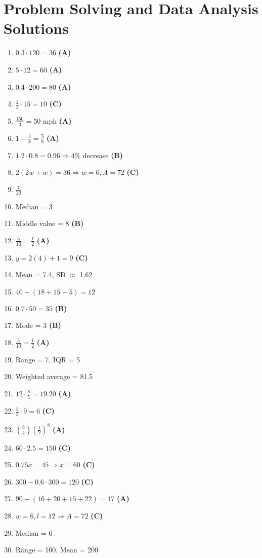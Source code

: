 \documentclass[12pt]{article}
\begin{document}
\section{Problem Solving and Data Analysis Solutions}
\begin{enumerate}[label=\textbf{Question \arabic*:}]
  \item \( 0.3 \cdot 120 = 36 \) \textbf{(A)}
  \item \( 5 \cdot 12 = 60 \) \textbf{(A)}
  \item \( 0.4 \cdot 200 = 80 \) \textbf{(A)}
  \item \( \frac{2}{3} \cdot 15 = 10 \) \textbf{(C)}
  \item \( \frac{150}{3} = 50 \) mph \textbf{(A)}
  \item \( 1 - \frac{3}{8} = \frac{5}{8} \) \textbf{(A)}
  \item \( 1.2 \cdot 0.8 = 0.96 \Rightarrow 4\% \) decrease \textbf{(B)}
  \item \( 2(2w + w) = 36 \Rightarrow w = 6, A = 72 \) \textbf{(C)}
  \item \( \frac{7}{20} \)
  \item Median = 3
  \item Middle value = 8 \textbf{(B)}
  \item \( \frac{5}{10} = \frac{1}{2} \) \textbf{(A)}
  \item \( y = 2(4) + 1 = 9 \) \textbf{(C)}
  \item Mean = 7.4, SD \(\approx\) 1.62
  \item \( 40 - (18 + 15 - 5) = 12 \)
  \item \( 0.7 \cdot 50 = 35 \) \textbf{(B)}
  \item Mode = 3 \textbf{(B)}
  \item \( \frac{5}{10} = \frac{1}{2} \) \textbf{(A)}
  \item Range = 7, IQR = 5
  \item Weighted average = 81.5
  \item \( 12 \cdot \frac{8}{5} = 19.20 \) \textbf{(A)}
  \item \( \frac{2}{3} \cdot 9 = 6 \) \textbf{(C)}
  \item \( \binom{8}{4} \left(\frac{1}{2}\right)^8 \) \textbf{(A)}
  \item \( 60 \cdot 2.5 = 150 \) \textbf{(C)}
  \item \( 0.75x = 45 \Rightarrow x = 60 \) \textbf{(C)}
  \item \( 300 - 0.6 \cdot 300 = 120 \) \textbf{(C)}
  \item \( 90 - (16 + 20 + 15 + 22) = 17 \) \textbf{(A)}
  \item \( w = 6, l = 12 \Rightarrow A = 72 \) \textbf{(C)}
  \item Median = 6
  \item Range = 100, Mean = 200
\end{enumerate}
\end{document}
